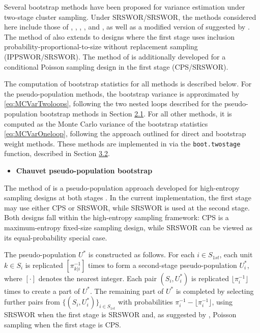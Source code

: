 Several bootstrap methods have been proposed for variance estimation under two-stage cluster sampling. Under SRSWOR/SRSWOR, the methods considered here include those of \citet{Rao:Wu:1988}, \citet{Rao:Wu:Yue:1992}, \citet{Funaoka:Saigo:Sitter:Toida:2006}, \citet{Chauvet:2007}, and \citet{Preston:2009}, as well as a modified version of \citet{Sitter:1992a} suggested by \citet{Chen:Haziza:Mashreghi:2022}. The method of \citet{Rao:Wu:Yue:1992} also extends to designs where the first stage uses inclusion probability-proportional-to-size without replacement sampling (IPPSWOR/SRSWOR). The method of \citet{Chauvet:2007} is additionally developed for a conditional Poisson sampling design in the first stage (CPS/SRSWOR).

The computation of bootstrap statistics for all methods is described below.
For the pseudo-population methods, the bootstrap variance is approximated by \eqref{eq:MCVarTwoloops}, following the two nested loops described for the pseudo-population bootstrap methods in Section \hyperref[Boot_STSRSWOR]{2.1}. For all other methods, it is computed as the Monte Carlo variance of the bootstrap statistics \eqref{eq:MCVarOneloop}, following the approach outlined for direct and bootstrap weight methods.
These methods are implemented in  via the \texttt{boot.twostage} function, described in Section \hyperref[sec:pkgbootsurvclust]{3.2}.

\begin{itemize}
\tightlist
\item
  \textbf{Chauvet pseudo-population bootstrap}
\end{itemize}

\noindent The method of \citet{Chauvet:2007} is a pseudo-population approach developed for high-entropy sampling designs at both stages \citep[e.g.,][]{Hajek:1964, Berger:1998, Matei:Tille:2005, Haziza:Rao:Mecatti:2008}. In the current implementation, the first stage may use either CPS or SRSWOR, while SRSWOR is used at the second stage. Both designs fall within the high-entropy sampling framework: CPS is a maximum-entropy fixed-size sampling design, while SRSWOR can be viewed as its equal-probability special case.

The pseudo-population \(U^*\) is constructed as follows. For each \(i \in \textrm{$S$}_{1st}\), each unit \(k \in \textrm{$S$}_i\) is replicated \([\pi_{k|i}^{-1}]\) times to form a second-stage pseudo-population \(U_i^*\), where \([\cdot]\) denotes the nearest integer. Each pair \((\textrm{$S$}_i, U_i^*)\) is replicated \(\lfloor \pi_i^{-1} \rfloor\) times to create a part of \(U^*\). The remaining part of \(U^*\) is completed by selecting further pairs from \(\{(\textrm{$S$}_i, U_i^*)\}_{i \in \textrm{$S$}_{1st}}\) with probabilities \(\pi_i^{-1} - \lfloor \pi_i^{-1} \rfloor\), using SRSWOR when the first stage is SRSWOR and, as suggested by \citet{Chauvet:2007}, Poisson sampling when the first stage is CPS.

